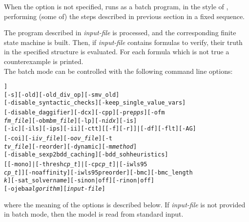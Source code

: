 When the  option is not specified, \nusmv
runs as a batch program, in the style of \smv, performing (some
of) the steps described in previous section in a fixed sequence.
\begin{alltt}
\shellprompt {} \ret
\end{alltt}
The program described in {\it input-file} is processed, and the
corresponding finite state machine is built.  Then, if \emph{input-file}
contains formulas to verify, their truth in the specified structure is
evaluated. For each formula which is not true a counterexample is
printed.\\
The batch mode can be controlled with
the following command line options:\\
\begin{alltt}
\nusmv [-h | -help] [-v {\it vl}] [-int] [[-source script_file | -load script_file]]
       [-s] [-old] [-old_div_op] [-smv_old]
       [-disable_syntactic_checks] [-keep_single_value_vars]
       [-disable_daggifier] [-dcx] [-cpp] [-pre {\it pps}] [-ofm {\it
       fm\_file}] [-obm {\it bm\_file}] [-lp] [-n {\it idx}] [-is]
       [-ic] [-ils] [-ips] [-ii] [-ctt] [[-f] [-r]]|[-df] [-flt] [-AG]
       [-coi] [-i {\it iv\_file}] [-o {\it ov\_file}] [-t {\it
       tv\_file}] [-reorder] [-dynamic] [-m {\it method}]
       [-disable_sexp2bdd_caching] [-bdd_soh heuristics]
       [[-mono]|[-thresh {\it cp\_t}]|[-cp {\it cp\_t}]|[-iwls95 {\it
       cp\_t}]] [-noaffinity] [-iwls95preorder] [-bmc] [-bmc\_length
       {\it k}] [-sat\_solver {\it name}] [-sin on|off] [-rin on|off]
       [-ojeba {\it algorithm}] [{\it input-file}]

\end{alltt}
where the meaning of the options is described below. If
{\it input-file} is not provided in batch mode, then the model is read
from standard input.\\

